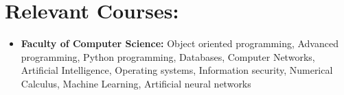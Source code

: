\documentclass[10pt,a4paper,sans]{moderncv}
\begin{document}
	\section{Relevant Courses:}
		\begin{itemize}
			\vspace{5pt}
			\item \textbf{Faculty of Computer Science: }Object oriented programming, Advanced programming, Python programming, Databases, Computer Networks, 
			Artificial Intelligence, Operating systems, Information security, Numerical Calculus, Machine Learning, Artificial neural networks
		\end{itemize}
	
	\clearpage
\end{document}
